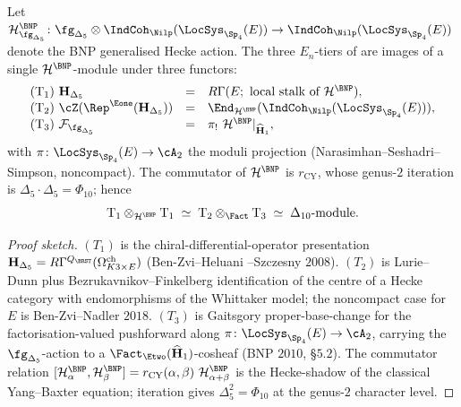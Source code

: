 \begin{theorem}
\label{thm:wave6-x2-bnp-threads-three-tiers}
Let $\mathcal H^{\BNP}_{\fg_{\Delta_5}} \colon
\fg_{\Delta_5} \otimes
\IndCoh_{\Nilp}(\LocSys_{\Sp_4}(E)) \to
\IndCoh_{\Nilp}(\LocSys_{\Sp_4}(E))$ denote the BNP generalised
Hecke action. The three $E_n$-tiers of
 are images of a single
$\mathcal H^{\BNP}$-module under three functors:
\begin{equation*}
\begin{array}{lcl}
(\mathrm T_1)\ \mathbf H_{\Delta_5} & = &
R\Gamma(E;\ \text{local stalk of}\ \mathcal H^{\BNP}), \\
(\mathrm T_2)\ \cZ(\Rep^{\Eone}(\mathbf H_{\Delta_5})) & = &
\End_{\mathcal H^{\BNP}}(\IndCoh_{\Nilp}(\LocSys_{\Sp_4}(E))), \\
(\mathrm T_3)\ \mathcal F_{\fg_{\Delta_5}} & = &
\pi_!\ \mathcal H^{\BNP}|_{\widehat{\mathbf H}_1},
\end{array}
\end{equation*}
with $\pi \colon \LocSys_{\Sp_4}(E) \to \cA_2$ the moduli
projection (Narasimhan--Seshadri--Simpson, noncompact). The
commutator of $\mathcal H^{\BNP}$ is $r_{\mathrm{CY}}$, whose
genus-$2$ iteration is $\Delta_5 \cdot \Delta_5 = \Phi_{10}$;
hence
\begin{equation*}
\mathrm T_1 \otimes_{\mathcal H^{\BNP}} \mathrm T_1 \;\simeq\;
\mathrm T_2 \otimes_{\Fact} \mathrm T_3 \;\simeq\;
\Delta_{10}\text{-module}.
\end{equation*}
\end{theorem}

\begin{proof}[Proof sketch]
$(T_1)$ is the chiral-differential-operator presentation
$\mathbf H_{\Delta_5} = R\Gamma^{Q_{\BRST}}
(\Omega^{\mathrm{ch}}_{K3 \times E})$ (Ben-Zvi--Heluani
--Szczesny $2008$). $(T_2)$ is Lurie--Dunn plus
Bezrukavnikov--Finkelberg identification of the centre of a
Hecke category with endomorphisms of the Whittaker model; the
noncompact case for $E$ is Ben-Zvi--Nadler $2018$. $(T_3)$ is
Gaitsgory proper-base-change for the factorisation-valued
pushforward along
$\pi \colon \LocSys_{\Sp_4}(E) \to \cA_2$, carrying the
$\fg_{\Delta_5}$-action to a
$\Fact_{\Etwo}(\widehat{\mathbf H}_1)$-cosheaf (BNP $2010$,
\S$5.2$). The commutator relation
$[\mathcal H^{\BNP}_\alpha, \mathcal H^{\BNP}_\beta] =
r_{\mathrm{CY}}(\alpha, \beta)\ \mathcal H^{\BNP}_{\alpha +
\beta}$ is the Hecke-shadow of the classical Yang--Baxter
equation; iteration gives $\Delta_5^2 = \Phi_{10}$ at the
genus-$2$ character level.
\end{proof}

